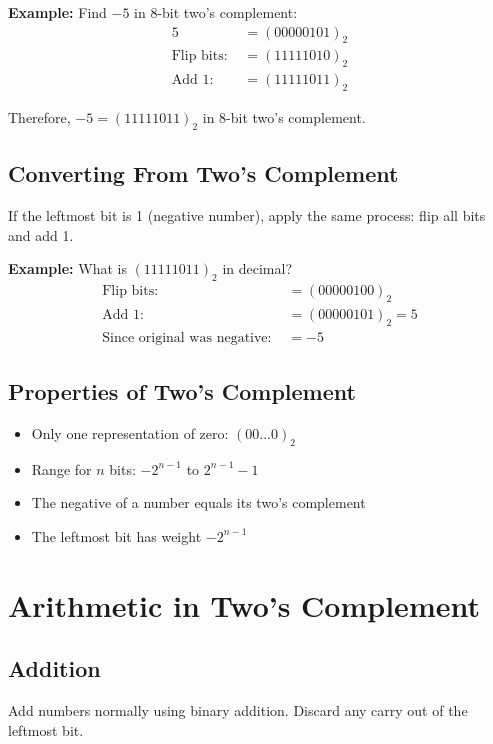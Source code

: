 \documentclass{report}
\begin{document}
\textbf{Example:} Find $-5$ in 8-bit two's complement:
\begin{align*}
    5 &= (00000101)_2 \\
    \text{Flip bits: } &= (11111010)_2 \\
    \text{Add 1: } &= (11111011)_2
\end{align*}

Therefore, $-5 = (11111011)_2$ in 8-bit two's complement.

\subsection{Converting From Two's Complement}

If the leftmost bit is 1 (negative number), apply the same process: flip all bits and add 1.

\textbf{Example:} What is $(11111011)_2$ in decimal?
\begin{align*}
    \text{Flip bits: } &= (00000100)_2 \\
    \text{Add 1: } &= (00000101)_2 = 5 \\
    \text{Since original was negative: } &= -5
\end{align*}

\subsection{Properties of Two's Complement}

\begin{itemize}
    \item Only one representation of zero: $(00...0)_2$
    \item Range for $n$ bits: $-2^{n-1}$ to $2^{n-1} - 1$
    \item The negative of a number equals its two's complement
    \item The leftmost bit has weight $-2^{n-1}$
\end{itemize}

\section{Arithmetic in Two's Complement}

\subsection{Addition}

Add numbers normally using binary addition. Discard any carry out of the leftmost bit.
\end{document}
